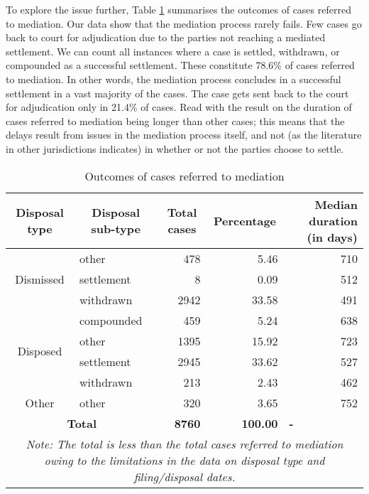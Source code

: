 \documentclass[12pt,a4paper]{article}
\begin{document}
	To explore the issue further, Table \ref{tab:mediation} summarises the outcomes of cases referred to mediation. %
	Our data show that the mediation process rarely fails. Few cases go back to court for adjudication due to the parties not reaching a mediated settlement. We can count all instances where a case is settled, withdrawn, or compounded as a successful settlement. These constitute 78.6\% of cases referred to mediation. In other words, the mediation process concludes in a successful settlement in a vast majority of the cases. The case gets sent back to the court for adjudication only in 21.4\% of cases. Read with the result on the duration of cases referred to mediation being longer than other cases; this means that the delays result from issues in the mediation process itself, and not (as the literature in other jurisdictions indicates) in whether or not the parties choose to settle.
	
	\begin{table}[!ht]
	\caption{Outcomes of cases referred to mediation}
	\label{tab:mediation}
	\centering
	\footnotesize
	\begin{tabular}{clrrr}
			\toprule
			\textbf{Disposal type} & \multicolumn{1}{c}{\textbf{Disposal sub-type}} & \multicolumn{1}{c}{\textbf{Total cases}} & \multicolumn{1}{c}{\textbf{Percentage}} & \multicolumn{1}{p{3cm}}{\textbf{Median duration (in days)}} \\
			\midrule %
			\multirow{3}{*}{Dismissed} & other & 478 & 5.46 & 710 \\
			& settlement & 8 & 0.09 & 512 \\
			& withdrawn & 2942 & 33.58 & 491 \\
			\midrule
			\multirow{4}{*}{Disposed} & compounded & 459 & 5.24 & 638 \\
			& other & 1395 & 15.92 & 723 \\
			& settlement & 2945 & 33.62 & 527 \\
			& withdrawn & 213 & 2.43 & 462 \\
			\midrule
			Other & other & 320 & 3.65 & 752 \\
			\midrule
			\multicolumn{2}{c}{\textbf{Total}} & \textbf{8760} & \textbf{100.00} & \multicolumn{1}{l}{\textbf{-}} \\
			\bottomrule \multicolumn{5}{p{11cm}}{{\footnotesize \emph{Note:
						The total is less than the total cases referred to mediation owing to the limitations in the data on disposal type and filing/disposal dates.}}}
	\end{tabular}
	\end{table}
	
\end{document}
